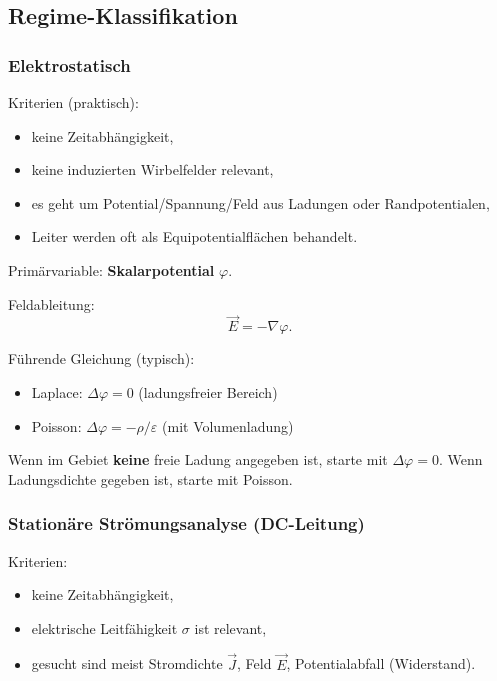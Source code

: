 \documentclass[a4paper]{article}
\newcommand{\imp}[1]{{\color{accent}\bfseries #1}}
\newcommand{\E}{\vec E}
\newcommand{\J}{\vec J}
\newcommand{\eps}{\varepsilon}
\begin{document}
\subsection{Regime-Klassifikation}

\subsubsection{Elektrostatisch}
Kriterien (praktisch):
\begin{itemize}
  \item keine Zeitabhängigkeit,
  \item keine induzierten Wirbelfelder relevant,
  \item es geht um Potential/Spannung/Feld aus Ladungen oder Randpotentialen,
  \item Leiter werden oft als Equipotentialflächen behandelt.
\end{itemize}

Primärvariable: \imp{Skalarpotential} $\varphi$.

Feldableitung:
\[
\E = -\nabla\varphi.
\]

Führende Gleichung (typisch):
\begin{itemize}
  \item Laplace: $\Delta \varphi = 0$ (ladungsfreier Bereich)
  \item Poisson: $\Delta \varphi = -\rho/\eps$ (mit Volumenladung)
\end{itemize}

\begin{checkitem}
Wenn im Gebiet \imp{keine} freie Ladung angegeben ist, starte mit $\Delta\varphi=0$.
Wenn Ladungsdichte gegeben ist, starte mit Poisson.
\end{checkitem}

\subsubsection{Stationäre Strömungsanalyse (DC-Leitung)}
Kriterien:
\begin{itemize}
  \item keine Zeitabhängigkeit,
  \item elektrische Leitfähigkeit $\sigma$ ist relevant,
  \item gesucht sind meist Stromdichte $\J$, Feld $\E$, Potentialabfall (Widerstand).
\end{itemize}
\end{document}
